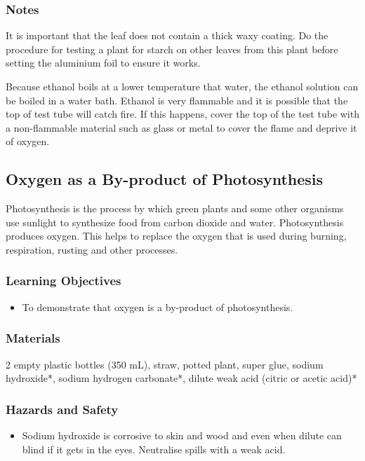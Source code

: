 \subsubsection*{Notes}
It is important that the leaf does not contain a thick waxy coating. Do the procedure for testing a plant for starch on other leaves from this plant before setting the aluminium foil to ensure it works.

Because ethanol boils at a lower temperature that water, the ethanol solution can be boiled in a water bath. Ethanol is very flammable and it is possible that the top of test tube will catch fire. If this happens, cover the top of the test tube with a non-flammable material such as glass or metal to cover the flame and deprive it of oxygen.

\subsection{Oxygen as a By-product of Photosynthesis}

Photosynthesis is the process by which green plants and some other organisms use sunlight to synthesize food from carbon dioxide and water. Photosynthesis produces oxygen. This helps to replace the oxygen that is used during burning, respiration, rusting and other processes.

\subsubsection*{Learning Objectives}
\begin{itemize}
\item{To demonstrate that oxygen is a by-product of photosynthesis.}
\end{itemize}

\subsubsection*{Materials}
2 empty plastic bottles (350 mL), straw, potted plant, super glue, sodium hydroxide*, sodium hydrogen carbonate*, dilute weak acid (citric or acetic acid)*

\subsubsection*{Hazards and Safety}
\begin{itemize}
\item{Sodium hydroxide is corrosive to skin and wood and even when dilute can blind if it gets in the eyes. Neutralise spills with a weak acid.}
\end{itemize}

